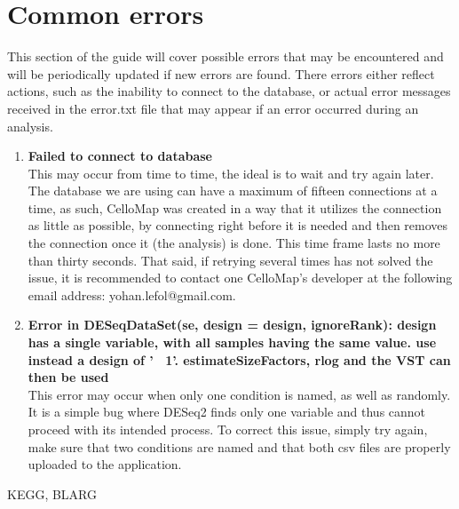\documentclass[11pt]{article}
\begin{document}
\section{Common errors \label{common_err}}
This section of the guide will cover possible errors that may be encountered and will be periodically updated if new errors are found. There errors either reflect actions, such as the inability to connect to the database, or actual error messages received in the error.txt file that may appear if an error occurred during an analysis.
\begin{enumerate}
\item \textbf{Failed to connect to database}\\
This may occur from time to time, the ideal is to wait and try again later. The database we are using can have a maximum of fifteen connections at a time, as such, CelloMap was created in a way that it utilizes the connection as little as possible, by connecting right before it is needed and then removes the connection once it (the analysis) is done. This time frame lasts no more than thirty seconds.
That said, if retrying several times has not solved the issue, it is recommended to contact one CelloMap's developer at the following email address: yohan.lefol@gmail.com.

\item \textbf{Error in DESeqDataSet(se, design = design, ignoreRank): design has a single variable, with all samples having the same value. use instead a design of '~ 1'. estimateSizeFactors, rlog and the VST can then be used}\\
This error may occur when only one condition is named, as well as randomly. It is a simple bug where \acrshort{DESeq2} finds only one variable and thus cannot proceed with its intended process.
To correct this issue, simply try again, make sure that two conditions are named and that both \acrshort{csv} files are properly uploaded to the application.
  
\end{enumerate}

\acrshort{KEGG}, BLARG

\printglossary[type=\acronymtype]



\end{document}
